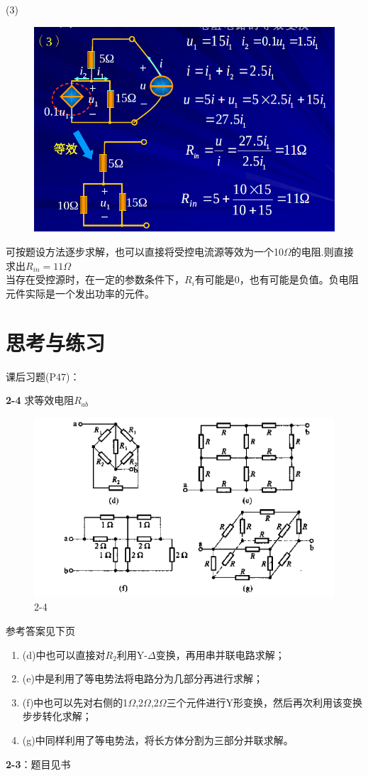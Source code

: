 \documentclass[11pt,a4paper,oneside]{book}
\begin{document}
(3)
\begin{figure}[H]
	\centering
	\includegraphics[width=0.6\linewidth]{screenshot028}
	\caption{}
	\label{fig:screenshot028}
\end{figure}
可按题设方法逐步求解，也可以直接将受控电流源等效为一个10$\Omega$的电阻.则直接求出$R_{in}=11\Omega$
~\\

当存在受控源时，在一定的参数条件下，$R_i$有可能是0，也有可能是负值。负电阻元件实际是一个发出功率的元件。
\section{思考与练习}
课后习题(P47)：

\noindent\textbf{2-4} 求等效电阻$R_{ab}$
\begin{figure}[H]
	\centering
	\includegraphics[width=0.7\linewidth]{screenshot030}
	\caption{2-4}
	\label{fig:screenshot030}
\end{figure}
参考答案见下页
\begin{enumerate}
	\item[(1)](d)中也可以直接对$R_2$利用Y-$\Delta$变换，再用串并联电路求解；
	\item[(2)](e)中是利用了等电势法将电路分为几部分再进行求解；
	\item[(3)](f)中也可以先对右侧的1$\Omega$,2$\Omega$,2$\Omega$三个元件进行Y形变换，然后再次利用该变换步步转化求解；
	\item[(4)](g)中同样利用了等电势法，将长方体分割为三部分并联求解。
\end{enumerate}
\noindent\textbf{2-3}：题目见书
\end{document}

